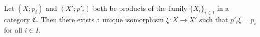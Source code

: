 Let $(X; p_i)$ and $(X'; p'_i)$ both be products of the family $\{X_i\}_{i \in I}$ in a category $\mathfrak{C}$. Then there exists a unique isomorphism $\xi : X \to X'$ such that $p'_i \xi = p_i$ for all $i \in I$.
